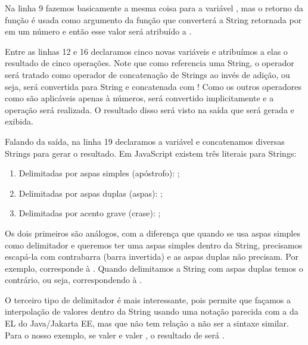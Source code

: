 Na linha 9 fazemos basicamente a mesma coisa para a variável , mas o retorno da função  é usada como argumento da função  que converterá a String retornada por  em um número e então esse valor será atribuído a .

Entre as linhas 12 e 16 declaramos cinco novas variáveis e atribuímos a elas o resultado de cinco operações. Note que como  referencia uma String, o operador \inlineJavaScriptCode{+} será tratado como operador de concatenação de Strings ao invés de adição, ou seja,  será convertida para String e concatenada com ! Como os outros operadores como são aplicáveis apenas à números,  será convertido implicitamente e a operação será realizada. O resultado disso será visto na saída que será gerada e exibida.

Falando da saída, na linha 19 declaramos a variável  e concatenamos diversas Strings para gerar o resultado. Em JavaScript existem três literais para Strings:
  
\begin{enumerate}
    \item Delimitadas por aspas simples (apóstrofo): ;
    \item Delimitadas por aspas duplas (aspas): ;
    \item Delimitadas por acento grave (crase): ;
\end{enumerate}

Os dois primeiros são análogos, com a diferença que quando se usa aspas simples como delimitador e queremos ter uma aspas simples dentro da String, precisamos escapá-la com contrabarra (barra invertida) e as aspas duplas não precisam. Por exemplo,  corresponde à . Quando delimitamos a String com aspas duplas temos o contrário, ou seja,  correspondendo à .

O terceiro tipo de delimitador é mais interessante, pois permite que façamos a interpolação de valores dentro da String usando uma notação parecida com a da EL do Java/Jakarta EE, mas que não tem relação a não ser a sintaxe similar. Para o nosso exemplo, se  valer  e  valer , o resultado de  será .

